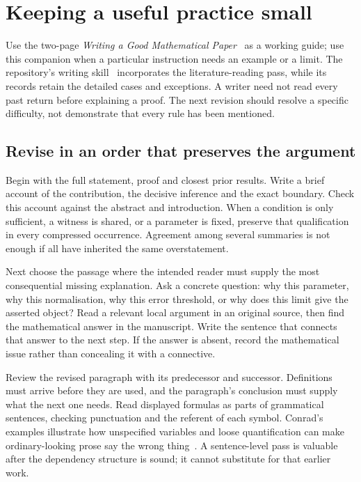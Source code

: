 \section{Keeping a useful practice small}\label{sec:practice}

Use the two-page \emph{Writing a Good Mathematical Paper}~\cite{compact} as a
working guide; use this companion when a particular instruction needs an
example or a limit. The repository's writing skill~\cite{skill} incorporates
the literature-reading pass, while its records retain the detailed cases and
exceptions. A writer need not read every past return before explaining a proof.
The next revision should resolve a specific difficulty, not demonstrate that
every rule has been mentioned.

\subsection{Revise in an order that preserves the argument}\label{sec:revision-order}

Begin with the full statement, proof and closest prior results. Write a brief
account of the contribution, the decisive inference and the exact boundary.
Check this account against the abstract and introduction. When a condition is
only sufficient, a witness is shared, or a parameter is fixed, preserve that
qualification in every compressed occurrence. Agreement among several summaries
is not enough if all have inherited the same overstatement.

Next choose the passage where the intended reader must supply the most
consequential missing explanation. Ask a concrete question: why this parameter,
why this normalisation, why this error threshold, or why does this limit give
the asserted object? Read a relevant local argument in an original source,
then find the mathematical answer in the manuscript. Write the sentence that
connects that answer to the next step. If the answer is absent, record the
mathematical issue rather than concealing it with a connective.

Review the revised paragraph with its predecessor and successor. Definitions
must arrive before they are used, and the paragraph's conclusion must supply
what the next one needs. Read displayed formulas as parts of grammatical
sentences, checking punctuation and the referent of each symbol. Conrad's
examples illustrate how unspecified variables and loose quantification can
make ordinary-looking prose say the wrong thing~\cite[\S\S1--2]{conrad}.
A sentence-level pass is valuable after the dependency structure is sound;
it cannot substitute for that earlier work.

